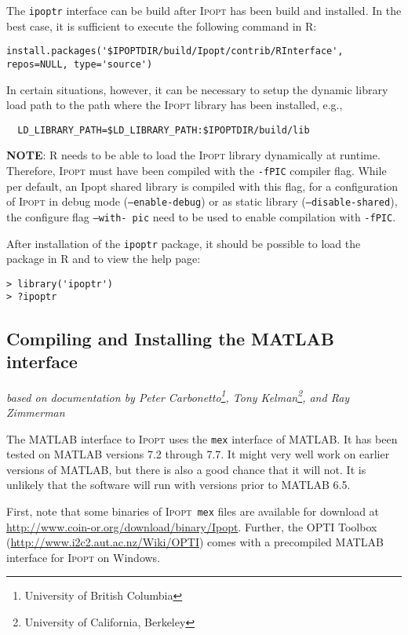 \documentclass[10pt]{article}
\newcommand{\Ipopt}{\textsc{Ipopt}\xspace}
\newcommand{\ipoptr}{\texttt{ipoptr}\xspace}
\newcommand{\Matlab}{\textsc{MATLAB}\xspace}
\begin{document}
The \ipoptr interface can be build after \Ipopt has been build and installed.
In the best case, it is sufficient to execute the following command in R:
\begin{verbatim}
install.packages('$IPOPTDIR/build/Ipopt/contrib/RInterface', repos=NULL, type='source')
\end{verbatim}

In certain situations, however, it can be necessary to setup the dynamic 
library load path to the path where the \Ipopt library has been installed, 
e.g.,
\begin{verbatim}
  LD_LIBRARY_PATH=$LD_LIBRARY_PATH:$IPOPTDIR/build/lib
\end{verbatim}

\textbf{NOTE}: R needs to be able to load the \Ipopt library dynamically 
at runtime. Therefore, \Ipopt must have been compiled with the {\tt -fPIC} 
compiler flag. While per default, an Ipopt shared library is compiled with 
this flag, for a configuration of \Ipopt in debug mode ({\tt --enable-debug}) 
or as static library ({\tt --disable-shared}), the configure flag {\tt --with-
pic} need to be used to enable compilation with {\tt -fPIC}.

After installation of the \ipoptr package, it should be possible to load the 
package in R and to view the help page:
\begin{verbatim}
> library('ipoptr')
> ?ipoptr
\end{verbatim}

\subsection{Compiling and Installing the \Matlab interface}
\label{sec.matlab.build}
\hfill \textit{based on documentation by Peter Carbonetto\footnote{University of British Columbia}, Tony Kelman\footnote{University of California, Berkeley}, and Ray Zimmerman}%
\medskip

The \Matlab interface to \Ipopt uses the {\tt mex} interface of \Matlab.
It has been tested on \Matlab versions 7.2 through 7.7. It might very well 
work on earlier versions of \Matlab, but there is also a good chance that it 
will not. It is unlikely that the software will run with versions prior to 
\Matlab 6.5.

First, note that some binaries of \Ipopt\ {\tt mex} files are available for download at
\url{http://www.coin-or.org/download/binary/Ipopt}.
Further, the OPTI Toolbox (\url{http://www.i2c2.aut.ac.nz/Wiki/OPTI}) comes with a 
precompiled \Matlab interface for \Ipopt on Windows.
\end{document}
